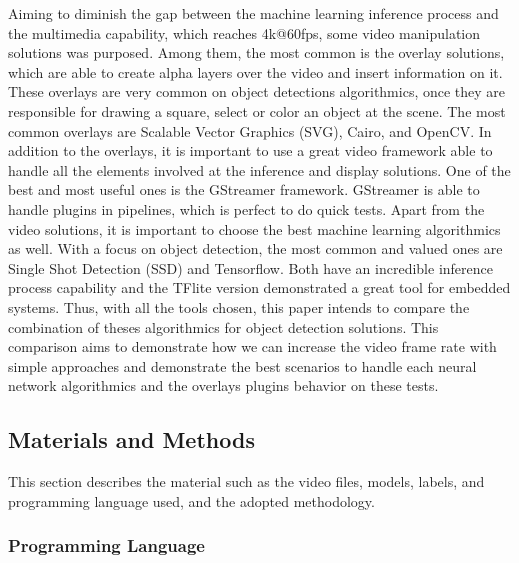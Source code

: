 \documentclass[11pt]{article}
\begin{document}
Aiming to diminish the gap between the machine learning inference
process and the multimedia capability, which reaches 4k@60fps, some
video manipulation solutions was purposed. Among them, the most common
is the overlay solutions, which are able to create alpha layers over the
video and insert information on it. These overlays are very common on
object detections algorithmics, once they are responsible for drawing a
square, select or color an object at the scene. The most common overlays
are Scalable Vector Graphics (SVG), Cairo, and OpenCV. In addition to
the overlays, it is important to use a great video framework able to
handle all the elements involved at the inference and display solutions.
One of the best and most useful ones is the GStreamer framework.
GStreamer is able to handle plugins in pipelines, which is perfect to do
quick tests. Apart from the video solutions, it is important to choose
the best machine learning algorithmics as well. With a focus on object
detection, the most common and valued ones are Single Shot Detection
(SSD) and Tensorflow. Both have an incredible inference process
capability and the TFlite version demonstrated a great tool for embedded
systems. Thus, with all the tools chosen, this paper intends to compare
the combination of theses algorithmics for object detection solutions.
This comparison aims to demonstrate how we can increase the video frame
rate with simple approaches and demonstrate the best scenarios to handle
each neural network algorithmics and the overlays plugins behavior on
these tests.

    \subsection{Materials and Methods}\label{materials-and-methods}

This section describes the material such as the video files, models,
labels, and programming language used, and the adopted methodology.

    \subsubsection{Programming Language}\label{programming-language}
\end{document}
